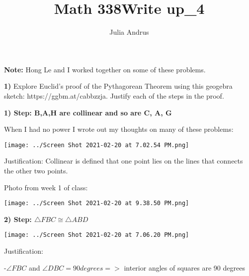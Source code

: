 \documentclass{article}
\title{Math 338\:Write up\_4}
\author{Julia Andrus}
\date{}
\begin{document}
\maketitle


\textbf{Note:} Hong Le and I worked together on some of these problems.

\vspace{2mm}

\textbf{1)} Explore Euclid’s proof of the Pythagorean Theorem using this geogebra sketch: https://ggbm.at/cabbzzja.  Justify each of the steps in the proof.

\vspace{2mm}

\textbf{1) Step: B,A,H are collinear and so are C, A, G}

\vspace{2mm}

When I had no power I wrote out my thoughts on many of these problems:

\vspace{2mm}

\texttt{[image: ../Screen Shot 2021-02-20 at 7.02.54 PM.png]} 


\vspace{2mm}

Justification: Collinear is defined that one point lies on the lines that connects the other two points. 

Photo from week 1 of class:

\vspace{2mm}

\texttt{[image: ../Screen Shot 2021-02-20 at 9.38.50 PM.png]} 

\vspace{4mm}

\textbf{2) Step: $\triangle FBC \cong \triangle ABD$}

\vspace{2mm}

\texttt{[image: ../Screen Shot 2021-02-20 at 7.06.20 PM.png]}

\vspace{2mm}

\newpage
Justification: 

\vspace{2mm}

-$\angle FBC$ and $\angle DBC=90 degrees  =>$ interior angles of squares are 90 degrees
\end{document}
